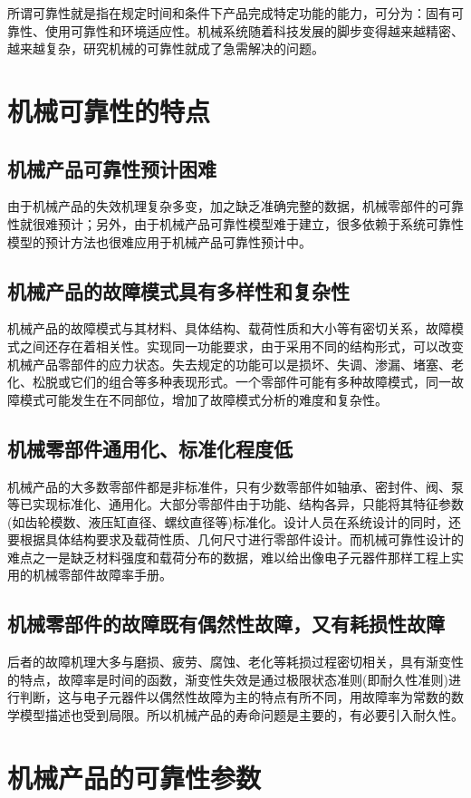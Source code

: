 \documentclass[a4paper,12pt]{article}
\begin{document}
所谓可靠性就是指在规定时间和条件下产品完成特定功能的能力，可分为：固有可靠性、使用可靠性和环境适应性。机械系统随着科技发展的脚步变得越来越精密、越来越复杂，研究机械的可靠性就成了急需解决的问题。


\section{机械可靠性的特点}
\subsection{机械产品可靠性预计困难}
由于机械产品的失效机理复杂多变，加之缺乏准确完整的数据，机械零部件的可靠性就很难预计；另外，由于机械产品可靠性模型难于建立，很多依赖于系统可靠性模型的预计方法也很难应用于机械产品可靠性预计中。
\subsection{机械产品的故障模式具有多样性和复杂性}
机械产品的故障模式与其材料、具体结构、载荷性质和大小等有密切关系，故障模式之间还存在着相关性。实现同一功能要求，由于采用不同的结构形式，可以改变机械产品零部件的应力状态。失去规定的功能可以是损坏、失调、渗漏、堵塞、老化、松脱或它们的组合等多种表现形式。一个零部件可能有多种故障模式，同一故障模式可能发生在不同部位，增加了故障模式分析的难度和复杂性。
\subsection{机械零部件通用化、标准化程度低}
机械产品的大多数零部件都是非标准件，只有少数零部件如轴承、密封件、阀、泵等已实现标准化、通用化。大部分零部件由于功能、结构各异，只能将其特征参数(如齿轮模数、液压缸直径、螺纹直径等)标准化。设计人员在系统设计的同时，还要根据具体结构要求及载荷性质、几何尺寸进行零部件设计。而机械可靠性设计的难点之一是缺乏材料强度和载荷分布的数据，难以给出像电子元器件那样工程上实用的机械零部件故障率手册。
\subsection{机械零部件的故障既有偶然性故障，又有耗损性故障}
后者的故障机理大多与磨损、疲劳、腐蚀、老化等耗损过程密切相关，具有渐变性的特点，故障率是时间的函数，渐变性失效是通过极限状态准则(即耐久性准则)进行判断，这与电子元器件以偶然性故障为主的特点有所不同，用故障率为常数的数学模型描述也受到局限。所以机械产品的寿命问题是主要的，有必要引入耐久性。
\section{机械产品的可靠性参数}
\end{document}
